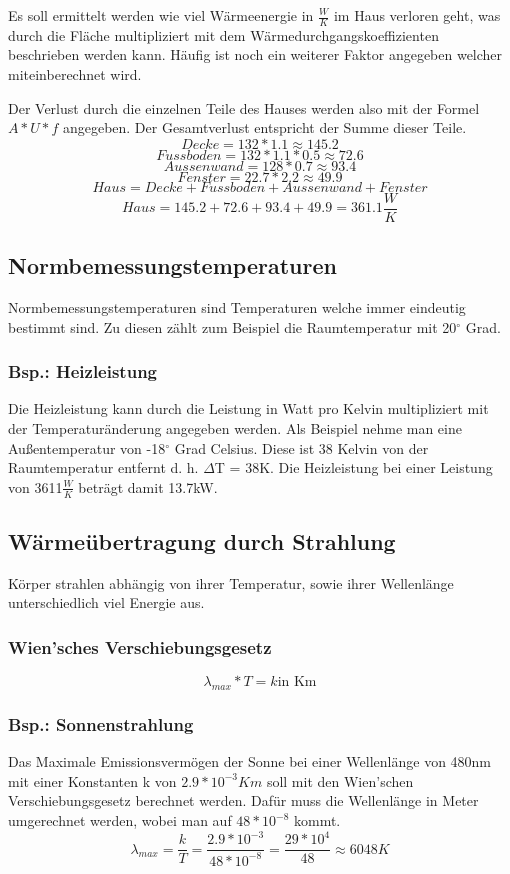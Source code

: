 \documentclass[a4paper,12pt]{article}
\begin{document}
Es soll ermittelt werden wie viel Wärmeenergie in $\frac{W}{K}$ im Haus verloren geht, was durch die Fläche multipliziert mit dem Wärmedurchgangskoeffizienten beschrieben werden kann. 
Häufig ist noch ein weiterer Faktor angegeben welcher miteinberechnet wird.

Der Verlust durch die einzelnen Teile des Hauses werden also mit der Formel $A * U * f$ angegeben. Der Gesamtverlust entspricht der Summe dieser Teile.
$$Decke = 132 * 1.1 \approx 145.2$$
$$Fussboden = 132 * 1.1 * 0.5 \approx 72.6$$
$$Aussenwand = 128 * 0.7 \approx 93.4$$
$$Fenster = 22.7 * 2.2 \approx 49.9$$
$$Haus = Decke + Fussboden + Aussenwand + Fenster$$
$$Haus = 145.2 + 72.6 + 93.4 + 49.9 = 361.1\frac{W}{K}$$

\subsection{Normbemessungstemperaturen}
Normbemessungstemperaturen sind Temperaturen welche immer eindeutig bestimmt sind. Zu diesen zählt zum Beispiel die Raumtemperatur mit 20$^\circ$ Grad.

\subsubsection{Bsp.: Heizleistung}
Die Heizleistung kann durch die Leistung in Watt pro Kelvin multipliziert mit der Temperaturänderung angegeben werden.
Als Beispiel nehme man eine Außentemperatur von -18$^\circ$ Grad Celsius. Diese ist 38 Kelvin von der Raumtemperatur entfernt d. h. $\Delta$T = 38K.
Die Heizleistung bei einer Leistung von 3611$\frac{W}{K}$ beträgt damit 13.7kW.

\subsection{Wärmeübertragung durch Strahlung}
Körper strahlen abhängig von ihrer Temperatur, sowie ihrer Wellenlänge unterschiedlich viel Energie aus.
\subsubsection{Wien'sches Verschiebungsgesetz}
$$\lambda_{max} * T = k \text{in Km}$$
\subsubsection{Bsp.: Sonnenstrahlung}
Das Maximale Emissionsvermögen der Sonne bei einer Wellenlänge von 480nm mit einer Konstanten k von $2.9 * 10^{-3}Km$ soll mit den Wien'schen Verschiebungsgesetz berechnet werden.
Dafür muss die Wellenlänge in Meter umgerechnet werden, wobei man auf $48 * 10^{-8}$ kommt.
$$\lambda_{max} = \frac{k}{T} = \frac{2.9 * 10^{-3}}{48 * 10^{-8}} = \frac{29 * 10^4}{48} \approx 6048K$$
\end{document}
